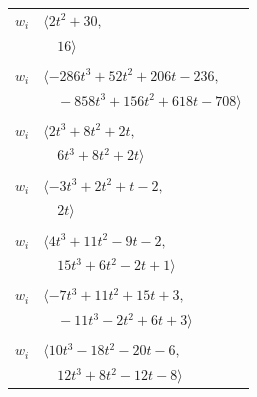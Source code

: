 \documentclass[11pt]{article}
\begin{document}
\begin{longtable}{@{}ll@{}}
$w_i$ & $\langle 2t^{2}+30,$\\
 & $\quad 16\rangle$\\
\addlinespace[2pt]
\multicolumn{2}{@{}p{0.97\textwidth}@{}}{$i=23$, $D_i=32$, $\rho_{ij}$: $3{:}2, \allowbreak 5{:}2, \allowbreak 6{:}1, \allowbreak 8{:}1, \allowbreak 21{:}1, \allowbreak 26{:}1, \allowbreak 29{:}2, \allowbreak 30{:}2, \allowbreak 41{:}2, \allowbreak 43{:}2$}\\
$w_i$ & $\langle -286t^{3}+52t^{2}+206t-236,$\\
 & $\quad -858t^{3}+156t^{2}+618t-708\rangle$\\
\addlinespace[2pt]
\multicolumn{2}{@{}p{0.97\textwidth}@{}}{$i=24$, $D_i=2$, $\rho_{ij}$: $13{:}1, \allowbreak 33{:}2, \allowbreak 37{:}2, \allowbreak 38{:}2, \allowbreak 40{:}1, \allowbreak 42{:}1, \allowbreak 44{:}1$}\\
$w_i$ & $\langle 2t^{3}+8t^{2}+2t,$\\
 & $\quad 6t^{3}+8t^{2}+2t\rangle$\\
\addlinespace[2pt]
\multicolumn{2}{@{}p{0.97\textwidth}@{}}{$i=25$, $D_i=2$, $\rho_{ij}$: $6{:}2, \allowbreak 10{:}2, \allowbreak 19{:}2, \allowbreak 34{:}2$}\\
$w_i$ & $\langle -3t^{3}+2t^{2}+t-2,$\\
 & $\quad 2t\rangle$\\
\addlinespace[2pt]
\multicolumn{2}{@{}p{0.97\textwidth}@{}}{$i=26$, $D_i=8$, $\rho_{ij}$: $13{:}1, \allowbreak 14{:}2, \allowbreak 23{:}2, \allowbreak 31{:}2, \allowbreak 34{:}1, \allowbreak 35{:}2, \allowbreak 43{:}2$}\\
$w_i$ & $\langle 4t^{3}+11t^{2}-9t-2,$\\
 & $\quad 15t^{3}+6t^{2}-2t+1\rangle$\\
\addlinespace[2pt]
\multicolumn{2}{@{}p{0.97\textwidth}@{}}{$i=27$, $D_i=2$, $\rho_{ij}$: $0{:}1, \allowbreak 7{:}1, \allowbreak 14{:}2, \allowbreak 32{:}1, \allowbreak 37{:}1, \allowbreak 46{:}1, \allowbreak 47{:}2$}\\
$w_i$ & $\langle -7t^{3}+11t^{2}+15t+3,$\\
 & $\quad -11t^{3}-2t^{2}+6t+3\rangle$\\
\addlinespace[2pt]
\multicolumn{2}{@{}p{0.97\textwidth}@{}}{$i=28$, $D_i=4$, $\rho_{ij}$: $12{:}2, \allowbreak 29{:}2, \allowbreak 35{:}2, \allowbreak 38{:}1, \allowbreak 40{:}2, \allowbreak 41{:}1, \allowbreak 45{:}2$}\\
$w_i$ & $\langle 10t^{3}-18t^{2}-20t-6,$\\
 & $\quad 12t^{3}+8t^{2}-12t-8\rangle$\\

\end{longtable}
\end{document}
